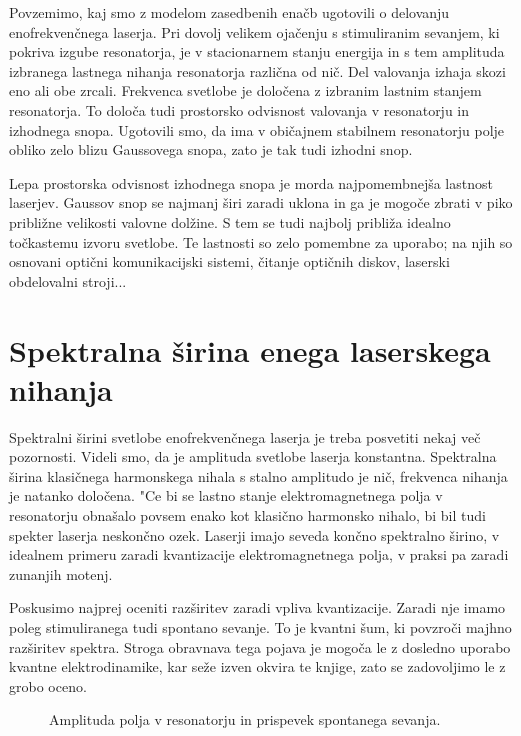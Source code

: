 Povzemimo, kaj smo z modelom zasedbenih enačb ugotovili o delovanju
enofrekvenčnega laserja. Pri dovolj velikem ojačenju s stimuliranim
sevanjem, ki pokriva izgube resonatorja, je v stacionarnem stanju energija
in s tem amplituda izbranega lastnega nihanja resonatorja različna od nič.
Del valovanja izhaja skozi eno ali obe zrcali. Frekvenca svetlobe je
določena z izbranim lastnim stanjem resonatorja. To določa tudi prostorsko
odvisnost valovanja v resonatorju in izhodnega snopa. Ugotovili smo, da ima
v običajnem stabilnem resonatorju polje obliko zelo blizu Gaussovega snopa,
zato je tak tudi izhodni snop.

Lepa prostorska odvisnost izhodnega snopa je morda najpomembnejša lastnost
laserjev. Gaussov snop se najmanj širi zaradi uklona in ga je mogoče
zbrati v piko približne velikosti valovne dolžine. S tem se tudi najbolj
približa idealno točkastemu izvoru svetlobe. Te lastnosti so zelo pomembne
za uporabo; na njih so osnovani optični komunikacijski sistemi, čitanje
optičnih diskov, laserski obdelovalni stroji...

\section{Spektralna širina enega laserskega nihanja}

Spektralni širini svetlobe enofrekvenčnega laserja je treba posvetiti
nekaj več pozornosti. Videli smo, da je amplituda svetlobe laserja
konstantna. Spektralna širina klasičnega harmonskega nihala s stalno
amplitudo je nič, frekvenca nihanja je natanko določena. "Ce bi se lastno
stanje elektromagnetnega polja v resonatorju obnašalo povsem enako kot
klasično harmonsko nihalo, bi bil tudi spekter laserja neskončno ozek.
Laserji imajo seveda končno spektralno širino, v idealnem primeru zaradi
kvantizacije elektromagnetnega polja, v praksi pa zaradi zunanjih motenj.

Poskusimo najprej oceniti razširitev zaradi vpliva kvantizacije. Zaradi nje
imamo poleg stimuliranega tudi spontano sevanje. To je kvantni šum, ki
povzroči majhno razširitev spektra. Stroga obravnava tega pojava je
mogoča le z dosledno uporabo kvantne elektrodinamike, kar seže izven
okvira te knjige, zato se zadovoljimo le z grobo oceno.

\begin{figure}[tbp]
\label{s5.4} \vskip 5cm
\caption{Amplituda polja v resonatorju in prispevek spontanega sevanja.}
\end{figure}


